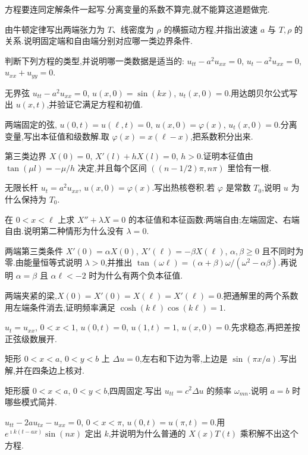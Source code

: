 方程要连同定解条件一起写.分离变量的系数不算完,就不能算这道题做完.

\begin{problemset}
\renewcommand{\theenumi}{\thechapter.\arabic{enumi}}
\renewcommand{\labelenumi}{\theenumi.}
\item 由牛顿定律写出两端张力为 $T$、线密度为 $\rho$ 的横振动方程,并指出波速 $a$ 与 $T,\rho$ 的关系.说明固定端和自由端分别对应哪一类边界条件.

\item 判断下列方程的类型,并说明哪一类数据是适当的: $u_{tt}-a^2 u_{xx}=0$, $u_t-a^2 u_{xx}=0$, $u_{xx}+u_{yy}=0$.

\item 无界弦 $u_{tt}-a^2 u_{xx}=0$, $u(x,0)=\sin(kx)$, $u_t(x,0)=0$.用达朗贝尔公式写出 $u(x,t)$,并验证它满足方程和初值.

\item 两端固定的弦, $u(0,t)=u(\ell,t)=0$, $u(x,0)=\varphi(x)$, $u_t(x,0)=0$.分离变量,写出本征值和级数解.取 $\varphi(x)=x(\ell-x)$,把系数积分出来.

\item 第三类边界 $X(0)=0$, $X'(l)+hX(l)=0$, $h>0$.证明本征值由 $\tan(\mu l)=-\mu/h$ 决定,并且每个区间 $((n-1/2)\pi,n\pi)$ 里恰有一根.

\item 无限长杆 $u_t=a^2 u_{xx}$, $u(x,0)=\varphi(x)$.写出热核卷积.若 $\varphi$ 是常数 $T_0$,说明 $u$ 为什么保持为 $T_0$.

\item 在 $0<x<\ell$ 上求 $X''+\lambda X=0$ 的本征值和本征函数:两端自由;左端固定、右端自由.说明第二种情形为什么没有 $\lambda=0$.

\item 两端第三类条件 $X'(0)=\alpha X(0)$, $X'(\ell)=-\beta X(\ell)$, $\alpha,\beta\geq 0$ 且不同时为零.由能量恒等式说明 $\lambda>0$,并推出 $\tan(\omega\ell)=(\alpha+\beta)\omega/(\omega^2-\alpha\beta)$.再说明 $\alpha=\beta$ 且 $\alpha\ell<-2$ 时为什么有两个负本征值.

\item 两端夹紧的梁,$X(0)=X'(0)=X(\ell)=X'(\ell)=0$.把通解里的两个系数用左端条件消去,证明频率满足 $\cosh(k\ell)\cos(k\ell)=1$.

\item $u_t=u_{xx}$, $0<x<1$, $u(0,t)=0$, $u(1,t)=1$, $u(x,0)=0$.先求稳态,再把差按正弦级数展开.

\item 矩形 $0<x<a$, $0<y<b$ 上 $\Delta u=0$,左右和下边为零,上边是 $\sin(\pi x/a)$.写出解,并在四条边上核对.

\item 矩形膜 $0<x<a$, $0<y<b$,四周固定.写出 $u_{tt}=c^2\Delta u$ 的频率 $\omega_{mn}$.说明 $a=b$ 时哪些模式简并.

\item $u_{tt}-2a u_{tx}-u_{xx}=0$, $0<x<\pi$, $u(0,t)=u(\pi,t)=0$.用 $e^{\imath k(t-ax)}\sin(nx)$ 定出 $k$,并说明为什么普通的 $X(x)T(t)$ 乘积解不出这个方程.
\end{problemset}
